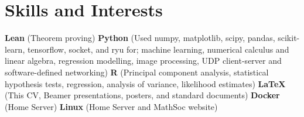 \documentclass[a4paper,10pt]{letter}
\begin{document}






\section{Skills and Interests}

\textbf{Lean} (Theorem proving)
\textbf{Python} (Used numpy, matplotlib, scipy, pandas, scikit-learn, tensorflow, socket, and ryu for; machine learning, numerical calculus and linear algebra, regression modelling, image processing, UDP client-server and software-defined networking) 
\textbf{R} (Principal component analysis, statistical hypothesis tests, regression, analysis of variance, likelihood estimates) 
\textbf{LaTeX} (This CV, Beamer presentations, posters, and standard documents) 
\textbf{Docker} (Home Server)
\textbf{Linux} (Home Server and MathSoc website)
\end{document}
